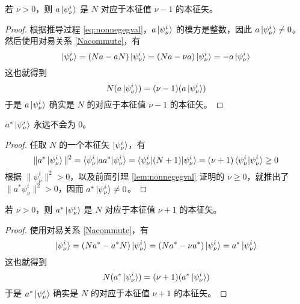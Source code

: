 \documentclass[cn,10pt,math=newtx,citestyle=gb7714-2015,bibstyle=gb7714-2015]{elegantbook}
\begin{document}
\begin{lemma}[降算符的作用]\label{lem:nonzeroegval}
若 $\nu > 0$，则 $a\ket{\psi_\nu^i}$ 是 $N$ 对应于本征值 $\nu-1$ 的本征矢。
\end{lemma}
\begin{proof}
    根据推导过程 \ref{eq:nonnegegval}，$a\ket{\psi_\nu^i}$ 的模方是整数，因此 $a\ket{\psi_\nu^i} \ne 0$。然后使用对易关系 \ref{Nacommute}，有
    \begin{equation}
        [N,a]\ket{\psi_\nu^i} = (Na-aN)\ket{\psi_\nu^i} = (Na-\nu a)\ket{\psi_\nu^i}= -a\ket{\psi_\nu^i} 
    \end{equation}
    这也就得到
    \begin{equation}
        N(a\ket{\psi_\nu^i})=(\nu-1)(a\ket{\psi_\nu^i})
    \end{equation}
    于是 $a\ket{\psi_\nu^i}$ 确实是 $N$ 的对应于本征值 $\nu-1$ 的本征矢。
\end{proof}

\begin{lemma}[升算符的零空间]\label{lem:zeroegval2}
    $a^*\ket{\psi_\nu^i}$ 永远不会为 0。
\end{lemma}
\begin{proof}
任取 $N$ 的一个本征矢 $\ket{\psi_\nu^i}$，有
    \begin{equation}
        \|a^*\ket{\psi_\nu^i}\|^2=\braket{\psi_\nu^i|aa^*|\psi_\nu^i}=\braket{\psi_\nu^i|(N+1)|\psi_\nu^i}=(\nu+1)\braket{\psi_\nu^i|\psi_\nu^i}\ge 0
    \end{equation}
    根据 $\|\psi_\nu^i\|^2>0$，以及前面引理 \ref{lem:nonnegegval} 证明的 $\nu\ge 0$，就推出了 $\|a^*\psi_\nu^i\|^2> 0$，因而 $a^*\ket{\psi_\nu^i}\ne 0$。
\end{proof}

\begin{lemma}[升算符的作用]\label{lem:nonzeroegval2}
    若 $\nu > 0$，则 $a^*\ket{\psi_\nu^i}$ 是 $N$ 对应于本征值 $\nu+1$ 的本征矢。
\end{lemma}
\begin{proof}
使用对易关系 \ref{Nacommute}，有
    \begin{equation}
        [N,a^*]\ket{\psi_\nu^i} = (Na^*-a^*N)\ket{\psi_\nu^i} = (Na^*-\nu a^*)\ket{\psi_\nu^i}= a^*\ket{\psi_\nu^i} 
    \end{equation}
    这也就得到
    \begin{equation}
        N(a^*\ket{\psi_\nu^i})=(\nu+1)(a^*\ket{\psi_\nu^i})
    \end{equation}
    于是 $a^*\ket{\psi_\nu^i}$ 确实是 $N$ 的对应于本征值 $\nu+1$ 的本征矢。
\end{proof}
\end{document}
